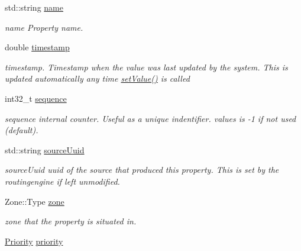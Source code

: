 \begin{DoxyCompactItemize}
\item 
std\-::string \hyperlink{classAbstractPropertyType_a0899de35293963a6c18a0f4913916871}{name}
\begin{DoxyCompactList}\small\item\em name Property name. \end{DoxyCompactList}\item 
double \hyperlink{classAbstractPropertyType_a6a391546600fde38a351d3d236be8a9b}{timestamp}
\begin{DoxyCompactList}\small\item\em timestamp. Timestamp when the value was last updated by the system. This is updated automatically any time \hyperlink{classAbstractPropertyType_a1b2598b86718911533587a5bd41bfb9c}{set\-Value()} is called \end{DoxyCompactList}\item 
\hypertarget{classAbstractPropertyType_ae74440c78c4a5f6af1c3b9c85f1a34c2}{int32\-\_\-t \hyperlink{classAbstractPropertyType_ae74440c78c4a5f6af1c3b9c85f1a34c2}{sequence}}\label{classAbstractPropertyType_ae74440c78c4a5f6af1c3b9c85f1a34c2}

\begin{DoxyCompactList}\small\item\em sequence internal counter. Useful as a unique indentifier. values is -\/1 if not used (default). \end{DoxyCompactList}\item 
\hypertarget{classAbstractPropertyType_abe2de53722d28e8e7c2a715b97e1ae48}{std\-::string \hyperlink{classAbstractPropertyType_abe2de53722d28e8e7c2a715b97e1ae48}{source\-Uuid}}\label{classAbstractPropertyType_abe2de53722d28e8e7c2a715b97e1ae48}

\begin{DoxyCompactList}\small\item\em source\-Uuid uuid of the source that produced this property. This is set by the routingengine if left unmodified. \end{DoxyCompactList}\item 
\hypertarget{classAbstractPropertyType_a420b96a1fcbcbe513ff3801185e788bc}{Zone\-::\-Type \hyperlink{classAbstractPropertyType_a420b96a1fcbcbe513ff3801185e788bc}{zone}}\label{classAbstractPropertyType_a420b96a1fcbcbe513ff3801185e788bc}

\begin{DoxyCompactList}\small\item\em zone that the property is situated in. \end{DoxyCompactList}\item 
\hypertarget{classAbstractPropertyType_a3f831860b5ddc30e5a53dd4937ae5ebe}{\hyperlink{classAbstractPropertyType_a1e513f66eb2dd2bd2cddbec16422af63}{Priority} \hyperlink{classAbstractPropertyType_a3f831860b5ddc30e5a53dd4937ae5ebe}{priority}}\label{classAbstractPropertyType_a3f831860b5ddc30e5a53dd4937ae5ebe}


\end{DoxyCompactItemize}
